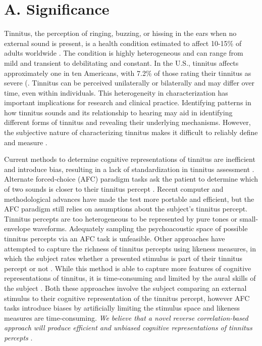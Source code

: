 \documentclass[11pt, notitlepage]{article} %
\begin{document}
\newpage

\section*{A. Significance}

Tinnitus, the perception of ringing, buzzing, or hissing in the ears when no external sound is present,
is a health condition estimated to affect 10-15\% of adults worldwide \cite{henryTinnitusEpidemiologicPerspective2020}.
The condition is highly heterogeneous and can range from mild and transient to debilitating and constant.
In the U.S., tinnitus affects approximately one in ten Americans, with 7.2\% of those rating their tinnitus as severe (\cite{bhattPrevalenceSeverityExposures2016}.
Tinnitus can be perceived unilaterally or bilaterally and may differ over time, even within individuals.
This heterogeneity in characterization has important implications for research
and clinical practice.
Identifying patterns in how tinnitus sounds and its relationship to hearing may aid in identifying
different forms of tinnitus and revealing their underlying mechanisms.
However, the subjective nature of characterizing tinnitus makes it difficult
to reliably define and measure \cite{vajsakovicPrinciplesMethodsPsychoacoustic2021}.

Current methods to determine cognitive representations of tinnitus
are inefficient and introduce bias, resulting in a lack of standardization in tinnitus assessment \cite{henryTinnitusEpidemiologicPerspective2020}.
Alternate forced-choice (AFC) paradigm tasks ask the patient to determine which of two sounds
is closer to their tinnitus percept
\cite{henryComparisonTwoComputerautomated2001,henryComputerautomatedTinnitusAssessment2004,henryComputerautomatedTinnitusAssessment2013,korthOneStepCloser2020}.
Recent computer and methodological advances have made the test more portable and efficient,
but the AFC paradigm still relies on assumptions about the subject's tinnitus percept.
Tinnitus percepts are too heterogeneous to be represented by pure tones or small-envelope waveforms.
Adequately sampling the psychoacoustic space of possible tinnitus percepts via an AFC task is unfeasible.
Other approaches have attempted to capture the richness of tinnitus percepts using likeness measures,
in which the subject rates whether a presented stimulus is part of their tinnitus percept or not \cite{norenaPsychoacousticCharacterizationTinnitus2002}.
While this method is able to capture more features of cognitive representations of tinnitus,
it is time-consuming and limited by the aural skills of the subject \cite{vajsakovicPrinciplesMethodsPsychoacoustic2021}.
Both these approaches involve the subject comparing an external stimulus to their cognitive representation of the tinnitus percept,
however AFC tasks introduce biases by artificially limiting the stimulus space and likeness measures are time-consuming.
\emph{We believe that a novel reverse correlation-based approach will produce efficient and unbiased cognitive representations of tinnitus percepts}
\cite{gosselinSuperstitiousPerceptionsReveal2003}.
\end{document}

